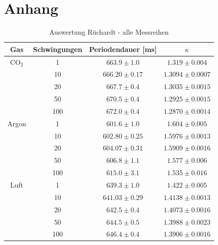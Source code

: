 \documentclass[12pt,a4paper,titlepage,headinclude,bibtotoc]{scrartcl}
\begin{document}
\section{Anhang}
\begin{table}[!htb]
	\centering
	\begin{tabular}{|c|c|c|c|}
		\hline
		Gas & Schwingungen & Periodendauer [ms] &$\kappa$\\
		\hline
		\hline
		CO$_2$
		& 1 & $663.9 \pm 1.0$ & $1.319 \pm 0.004$ \\
		& 10 & $666.20 \pm 0.17$ & $1.3094 \pm 0.0007$ \\
		& 20 & $667.7 \pm 0.4$ & $1.3035 \pm 0.0015$ \\
		& 50 & $670.5 \pm 0.4$ & $1.2925 \pm 0.0015$ \\
		& 100 & $672.0 \pm 0.4$ & $1.2870 \pm 0.0014$ \\
		\hline
		Argon
		& 1 & $601.6 \pm 1.0$ & $1.604 \pm 0.005$ \\
		& 10 & $602.80 \pm 0.25$ & $1.5976 \pm 0.0013$ \\
		& 20 & $604.07 \pm 0.31$ & $1.5909 \pm 0.0016$ \\
		& 50 & $606.8 \pm 1.1$ & $1.577 \pm 0.006$ \\
		& 100 & $615.0 \pm 3.1$ & $1.535 \pm 0.016$ \\
		\hline		
		Luft
		& 1 & $639.3 \pm 1.0$ & $1.422 \pm 0.005$ \\
		& 10 & $641.03 \pm 0.29$ & $1.4138 \pm 0.0013$ \\
		& 20 & $642.5 \pm 0.4$ & $1.4073 \pm 0.0016$ \\
		& 50 & $644.5 \pm 0.5$ & $1.3988 \pm 0.0023$ \\
		& 100 & $646.4 \pm 0.4$ & $1.3906 \pm 0.0016$ \\
		\hline
	\end{tabular}
	\caption{Auswertung Rüchardt - alle Messreihen}
	\label{tab:RuechardtGenauer}
\end{table}



\end{document}

